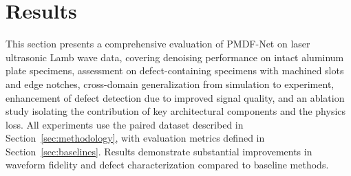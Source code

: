\section{Results}
\label{sec:results}

This section presents a comprehensive evaluation of PMDF-Net on laser ultrasonic Lamb wave data, covering denoising performance on intact aluminum plate specimens, assessment on defect-containing specimens with machined slots and edge notches, cross-domain generalization from simulation to experiment, enhancement of defect detection due to improved signal quality, and an ablation study isolating the contribution of key architectural components and the physics loss. All experiments use the paired dataset described in Section~\ref{sec:methodology}, with evaluation metrics defined in Section~\ref{sec:baselines}. Results demonstrate substantial improvements in waveform fidelity and defect characterization compared to baseline methods.